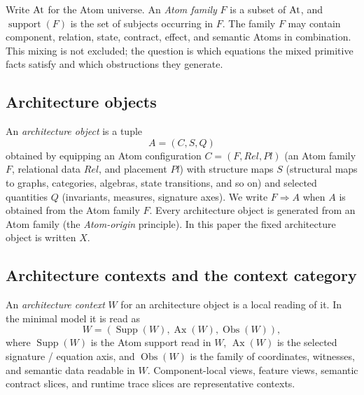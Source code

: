 \begin{definition}\label{def:atomfamily}
Write $\mathrm{At}$ for the Atom universe. An \emph{Atom family} $F$ is a subset
of $\mathrm{At}$, and $\operatorname{support}(F)$ is the set of subjects occurring
in $F$. The family $F$ may contain component, relation, state, contract,
effect, and semantic Atoms in combination. This mixing is not excluded; the
question is which equations the mixed primitive facts satisfy and which
obstructions they generate.
\end{definition}

\subsection{Architecture objects}\label{sec:32}

\begin{definition}\label{def:archobject}
An \emph{architecture object} is a tuple
\[
A = (C, S, Q)
\]
obtained by equipping an Atom configuration $C=(F,\mathit{Rel},\mathit{Pl})$
(an Atom family $F$, relational data $\mathit{Rel}$, and placement
$\mathit{Pl}$) with structure maps $S$ (structural maps to graphs,
categories, algebras, state transitions, and so on) and selected
quantities $Q$ (invariants, measures, signature axes). We write
$F \Rightarrow A$ when $A$ is obtained from the Atom family $F$. Every
architecture object is generated from an Atom family (the
\emph{Atom-origin} principle). In this paper the fixed architecture
object is written $X$.
\end{definition}

\subsection{Architecture contexts and the context category}\label{sec:33}

\begin{definition}\label{def:archcontext}
An \emph{architecture context} $W$ for an architecture object is a local
reading of it. In the minimal model it is read as
\[
W = (\operatorname{Supp}(W), \operatorname{Ax}(W), \operatorname{Obs}(W)),
\]
where $\operatorname{Supp}(W)$ is the Atom support read in $W$,
$\operatorname{Ax}(W)$ is the selected signature / equation axis, and
$\operatorname{Obs}(W)$ is the family of coordinates, witnesses, and
semantic data readable in $W$. Component-local views, feature views,
semantic contract slices, and runtime trace slices are representative
contexts.
\end{definition}


